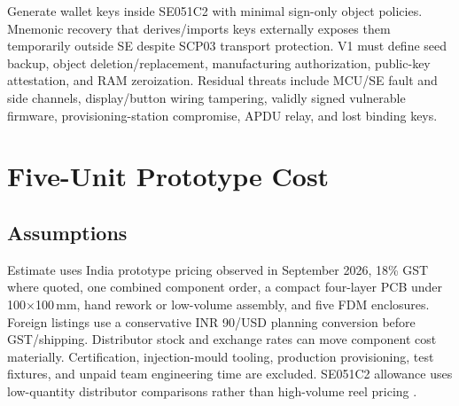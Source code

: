 \documentclass[10pt]{article}
\begin{document}
Generate wallet keys inside SE051C2 with minimal sign-only object policies.
Mnemonic recovery that derives/imports keys externally exposes them temporarily
outside SE despite SCP03 transport protection. V1 must define seed backup,
object deletion/replacement, manufacturing authorization, public-key
attestation, and RAM zeroization. Residual threats include MCU/SE fault and
side channels, display/button wiring tampering, validly signed vulnerable
firmware, provisioning-station compromise, APDU relay, and lost binding keys.

\section{Five-Unit Prototype Cost}
\subsection{Assumptions}
Estimate uses India prototype pricing observed in September 2026, 18\% GST
where quoted, one combined component order, a compact four-layer PCB under
100$\times$100\,mm, hand rework or low-volume assembly, and five FDM
enclosures. Foreign listings use a conservative INR 90/USD planning conversion
before GST/shipping. Distributor stock and exchange rates can move component cost
materially. Certification, injection-mould tooling, production provisioning,
test fixtures, and unpaid team engineering time are excluded.
SE051C2 allowance uses low-quantity distributor comparisons rather than
high-volume reel pricing \cite{se-price}.
\end{document}
